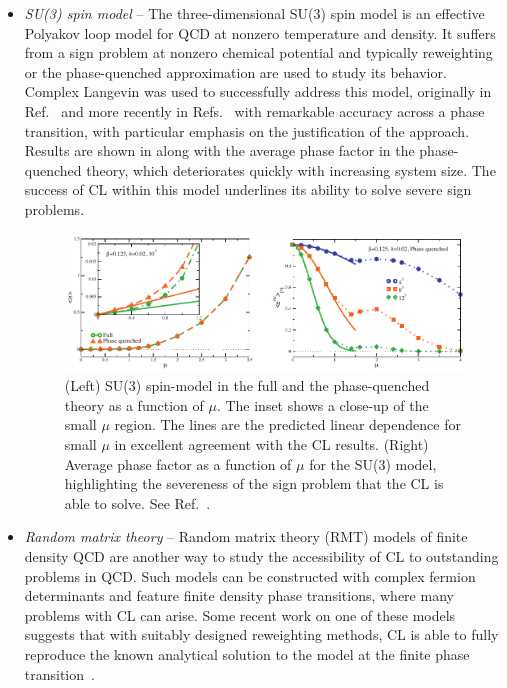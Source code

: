 \documentclass[../main.tex]{subfiles}
\begin{document}
\begin{itemize}
\item {\it SU(3) spin model} --
The three-dimensional SU(3) spin model is an effective Polyakov loop model for QCD at nonzero temperature and density. It suffers from a sign problem at nonzero chemical potential and typically reweighting or the phase-quenched approximation are used to study its behavior. Complex Langevin was used to successfully address this model, originally in Ref.~\cite{PhysRevLett.55.2242} and more recently in Refs.~\cite{Aarts2012SU3,Aarts:2012ft} with remarkable accuracy across a phase transition, with particular emphasis on the justification of the approach. Results are shown in  along with the average phase factor in the phase-quenched theory, which deteriorates quickly with increasing system size. The success of CL within this model underlines its ability to solve severe sign problems.
%
\begin{figure}
  \includegraphics[width=\textwidth]{./4applications-REL/fig11.pdf}
  \caption{(Left) SU(3) spin-model in the full and the phase-quenched theory as a function of $\mu$. The inset shows a close-up of the small $\mu$ region. The lines are the predicted linear dependence for small $\mu$ in excellent agreement with the CL results. (Right) Average phase factor as a function of $\mu$ for the SU(3) model, highlighting the severeness of the sign problem that the CL is able to solve. See Ref.~\cite{Aarts2012SU3}.}
  \label{fig:su3_plots}
\end{figure}


\item {\it Random matrix theory} --
Random matrix theory (RMT) models of finite density QCD are another way to study the accessibility of CL to outstanding problems in QCD. Such models can be constructed with complex fermion determinants and feature finite density phase transitions, where many problems with CL can arise. Some recent work on one of these models suggests that with suitably designed
reweighting methods, CL is able to fully reproduce the known analytical solution to the model at the finite phase transition~\cite{2017EPJWC13707030B}.


\end{itemize}
\end{document}
